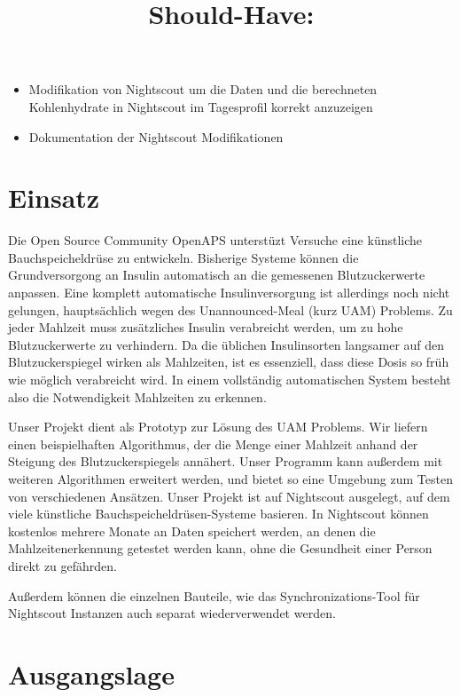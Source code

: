 \documentclass[accentcolor=tud0b,12pt,paper=a4]{tudreport}
\begin{document}
\title{\textbf{Should-Have:}}

\begin{itemize}	
	\item Modifikation von Nightscout um die Daten und die berechneten Kohlenhydrate in Nightscout im Tagesprofil korrekt anzuzeigen
\item Dokumentation der Nightscout Modifikationen
\end{itemize}

	
 	\chapter{Einsatz}
	
	Die Open Source Community OpenAPS unterstüzt Versuche eine künstliche Bauchspeicheldrüse zu entwickeln. Bisherige Systeme können die Grundversorgong an Insulin automatisch an die gemessenen Blutzuckerwerte anpassen. Eine komplett automatische Insulinversorgung ist allerdings noch nicht gelungen, hauptsächlich wegen des Unannounced-Meal (kurz UAM) Problems. Zu jeder Mahlzeit muss zusätzliches Insulin verabreicht werden, um zu hohe Blutzuckerwerte zu verhindern. Da die üblichen Insulinsorten langsamer auf den Blutzuckerspiegel wirken als Mahlzeiten, ist es essenziell, dass diese Dosis so früh wie möglich verabreicht wird. In einem vollständig automatischen System besteht also die Notwendigkeit Mahlzeiten zu erkennen.
	
	Unser Projekt dient als Prototyp zur Lösung des UAM Problems. Wir liefern einen beispielhaften Algorithmus, der die Menge einer Mahlzeit anhand der Steigung des Blutzuckerspiegels annähert. Unser Programm kann außerdem mit weiteren Algorithmen erweitert werden, und bietet so eine Umgebung zum Testen von verschiedenen Ansätzen. Unser Projekt ist auf Nightscout ausgelegt, auf dem viele künstliche Bauchspeicheldrüsen-Systeme basieren. In Nightscout können kostenlos mehrere Monate an Daten speichert werden, an denen die Mahlzeitenerkennung getestet werden kann, ohne die Gesundheit einer Person direkt zu gefährden. 
	
	Außerdem können die einzelnen Bauteile, wie das Synchronizations-Tool für Nightscout Instanzen auch separat wiederverwendet werden.

		
{\let\clearpage\relax	\chapter{Ausgangslage}}
\end{document}
